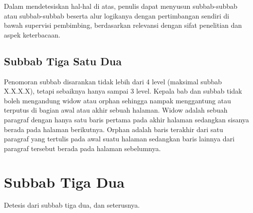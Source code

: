 Dalam mendetesiskan hal-hal di atas, penulis dapat menyusun subbab-subbab atau subbab-subbab beserta alur logikanya dengan pertimbangan sendiri di bawah supervisi pembimbing, berdasarkan relevansi dengan sifat penelitian dan aspek keterbacaan.

\subsection{Subbab Tiga Satu Dua}

Penomoran subbab disarankan tidak lebih dari 4 level (maksimal subbab X.X.X.X), tetapi sebaiknya hanya sampai 3 level. Kepala bab dan subbab tidak boleh mengandung widow atau orphan sehingga nampak menggantung atau terputus di bagian awal atau akhir sebuah halaman. Widow adalah sebuah paragraf dengan hanya satu baris pertama pada akhir halaman sedangkan sisanya berada pada halaman berikutnya. Orphan adalah baris terakhir dari satu paragraf yang tertulis pada awal suatu halaman sedangkan baris lainnya dari paragraf tersebut berada pada halaman sebelumnya.

\section{Subbab Tiga Dua}

Detesis dari subbab tiga dua, dan seterusnya.

